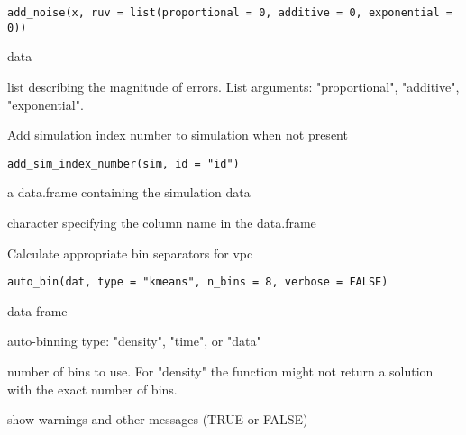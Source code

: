 \documentclass[letterpaper]{book}
\begin{document}
%
\begin{Usage}
\begin{verbatim}
add_noise(x, ruv = list(proportional = 0, additive = 0, exponential = 0))
\end{verbatim}
\end{Usage}
%
\begin{Arguments}
\begin{ldescription}
\item[\code{x}] data

\item[\code{ruv}] list describing the magnitude of errors. List arguments: "proportional", "additive", "exponential".
\end{ldescription}
\end{Arguments}
%
\begin{Description}\relax
Add simulation index number to simulation when not present
\end{Description}
%
\begin{Usage}
\begin{verbatim}
add_sim_index_number(sim, id = "id")
\end{verbatim}
\end{Usage}
%
\begin{Arguments}
\begin{ldescription}
\item[\code{sim}] a data.frame containing the simulation data

\item[\code{id}] character specifying the column name in the data.frame
\end{ldescription}
\end{Arguments}
%
\begin{Description}\relax
Calculate appropriate bin separators for vpc
\end{Description}
%
\begin{Usage}
\begin{verbatim}
auto_bin(dat, type = "kmeans", n_bins = 8, verbose = FALSE)
\end{verbatim}
\end{Usage}
%
\begin{Arguments}
\begin{ldescription}
\item[\code{dat}] data frame

\item[\code{type}] auto-binning type: "density", "time", or "data"

\item[\code{n\_bins}] number of bins to use. For "density" the function might not return a solution with the exact number of bins.

\item[\code{verbose}] show warnings and other messages (TRUE or FALSE)
\end{ldescription}
\end{Arguments}
\end{document}
